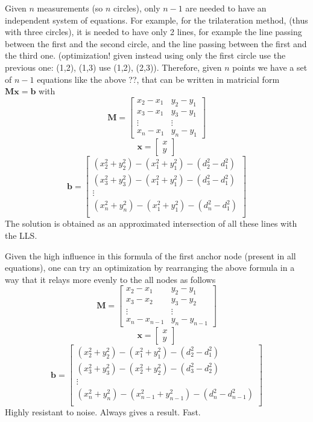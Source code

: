 \documentclass[12pt,twoside]{report}
\begin{document}
Given $n$ measurements (so $n$ circles), only $n-1$ are needed to have an independent system of equations. For example, for the trilateration method, (thus with three circles), it is needed to have only 2 lines, for example the line passing between the first and the second circle, and the line passing between the first and the third one. (optimization! given instead using only the first circle use the previous one: (1,2), (1,3) use (1,2), (2,3)).
Therefore, given $n$ points we have a set of $n-1$ equations like the above ??, that can be written in matricial form $\mathbf{Mx}=\mathbf{b}$ with
$$\mathbf{M}=\begin{bmatrix}
x_2-x_1&y_2-y_1\\
x_3-x_1&y_3-y_1\\
\vdots&\vdots\\
x_n-x_1&y_n-y_1
\end{bmatrix}$$
$$\mathbf{x}=\begin{bmatrix}
x\\
y
\end{bmatrix}$$
$$\mathbf{b}=\begin{bmatrix}
(x^2_2+y^2_2)-(x_1^2+y^2_1)-(d_2^2-d_1^2)\\
(x^2_3+y^2_3)-(x_1^2+y^2_1)-(d_3^2-d_1^2)\\
\vdots\\
(x^2_n+y^2_n)-(x_1^2+y^2_1)-(d_n^2-d_1^2)\\
\end{bmatrix}$$
The solution is obtained as an approximated intersection of all these lines with the LLS.

Given the high influence in this formula of the first anchor node (present in all equations), one can try an optimization by rearranging the above formula in a way that it relays more evenly to the all nodes as follows
$$\mathbf{M}=\begin{bmatrix}
x_2-x_1&y_2-y_1\\
x_3-x_2&y_3-y_2\\
\vdots&\vdots\\
x_n-x_{n-1}&y_n-y_{n-1}
\end{bmatrix}$$
$$\mathbf{x}=\begin{bmatrix}
x\\
y
\end{bmatrix}$$
$$\mathbf{b}=\begin{bmatrix}
(x^2_2+y^2_2)-(x_1^2+y^2_1)-(d_2^2-d_1^2)\\
(x^2_3+y^2_3)-(x_2^2+y^2_2)-(d_3^2-d_2^2)\\
\vdots\\
(x^2_n+y^2_n)-(x_{n-1}^2+y^2_{n-1})-(d_n^2-d_{n-1}^2)\\
\end{bmatrix}$$
Highly resistant to noise. Always gives a result. Fast.
\clearpage
\end{document}
